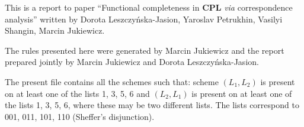 \documentclass[11pt]{article}
\begin{document}
	
	This is a report to paper ``Functional completeness in \textbf{CPL} \textit{via} correspondence analysis'' written by Dorota Leszczy\'{n}ska-Jasion, 
	Yaroslav Petrukhin, Vasilyi Shangin, Marcin Jukiewicz. 
	
	The rules presented here were generated by Marcin Jukiewicz and the report prepared jointly by Marcin Jukiewicz and Dorota Leszczy\'{n}ska-Jasion.
	
	The present file contains all the schemes such that: scheme $(L_1, L_2)$ is present on at least one of the lists 1, 3, 5, 6 and $(L_2, L_1)$ is present on at least one of the lists 1, 3, 5, 6, where these may be two different lists. The lists correspond to 001, 011, 101, 110 (Sheffer's disjunction).
	
	\bigskip
\begin{center}


\end{center}
\end{document}
